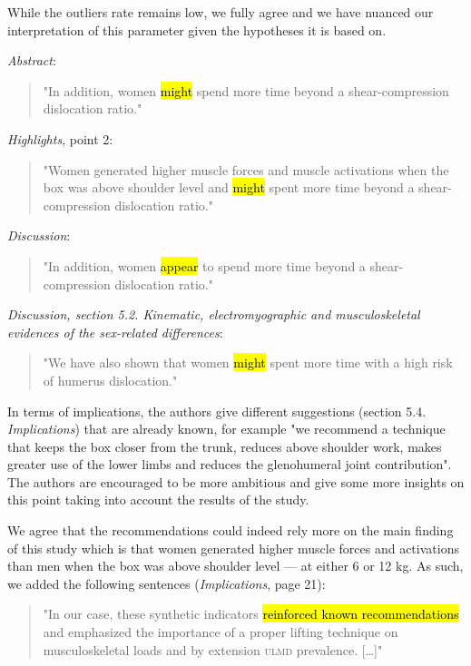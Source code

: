 \documentclass[preprint,review,12pt]{elsarticle}
\begin{document}
    While the outliers rate remains low, we fully agree and we have nuanced our interpretation of this parameter given the hypotheses it is based on.

    \textit{Abstract}:
    \begin{quote}
        "In addition, women \hl{might} spend more time beyond a shear-compression dislocation ratio."
    \end{quote}

    \textit{Highlights}, point 2:
    \begin{quote}
        "Women generated higher muscle forces and muscle activations when the box was above shoulder level and \hl{might} spent more time beyond a shear-compression dislocation ratio."
    \end{quote}

    \textit{Discussion}:
    \begin{quote}
        "In addition, women \hl{appear} to spend more time beyond a shear-compression dislocation ratio."
    \end{quote}

    \textit{Discussion, section 5.2. Kinematic, electromyographic and musculoskeletal evidences of the sex-related differences}:
    \begin{quote}
        "We have also shown that women \hl{might} spent more time with a high risk of humerus dislocation."
    \end{quote}

    \begin{formal}
        In terms of implications, the authors give different suggestions (section 5.4. \textit{Implications}) that are already known, for example "we recommend a technique that keeps the box closer from the trunk, reduces above shoulder work, makes greater use of the lower limbs and reduces the glenohumeral joint contribution".
        The authors are encouraged to be more ambitious and give some more insights on this point taking into account the results of the study.
    \end{formal}

    We agree that the recommendations could indeed rely more on the main finding of this study which is that women generated higher muscle forces and activations than men when the box was above shoulder level --- at either 6 or 12 kg.
    As such, we added the following sentences (\textit{Implications}, page 21):

    \begin{quote}
        "In our case, these synthetic indicators \hl{reinforced known recommendations} and emphasized the importance of a proper lifting technique on musculoskeletal loads and by extension \textsc{ulmd} prevalence. [\ldots]"
    \end{quote}
\end{document}
